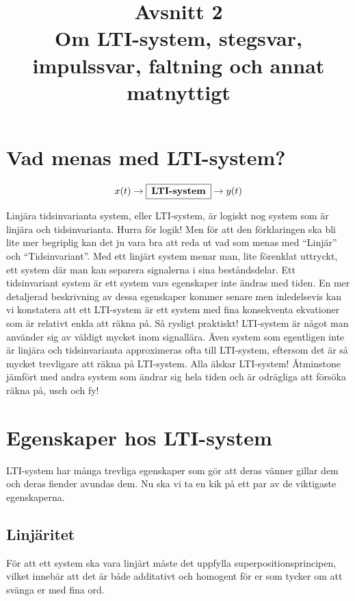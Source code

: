 \documentclass{article}
\title{Avsnitt 2 \\ 
\large Om LTI-system, stegsvar, impulssvar, faltning och annat matnyttigt}
\author{ }
\date{}
\begin{document}
\maketitle

\section{Vad menas med LTI-system?}
$$x(t) \rightarrow \framebox[1.2\width]{\textbf{LTI-system}} \rightarrow y(t) $$

Linjära tidsinvarianta system, eller LTI-system, är logiskt nog system som är
linjära och tidsinvarianta. Hurra för logik! Men för att den förklaringen ska
bli lite mer begriplig kan det ju vara bra att reda ut vad som menas med
“Linjär” och “Tidsinvariant”. Med ett linjärt system menar man, lite
förenklat uttryckt, ett system där man kan separera signalerna i sina
beståndsdelar. Ett tidsinvariant system är ett system vars egenskaper inte
ändras med tiden. En mer detaljerad beskrivning av dessa egenskaper kommer
senare men inledelsevis kan vi konstatera att ett LTI-system är ett system
med fina konsekventa ekvationer som är relativt enkla att räkna på. Så
rysligt praktiskt!
\newline
LTI-system är något man använder sig av väldigt mycket inom signallära. Även
system som egentligen inte är linjära och tidsinvarianta approximeras ofta
till LTI-system, eftersom det är så mycket trevligare att räkna på
LTI-system. Alla älskar LTI-system! Åtminstone jämfört med andra system som
ändrar sig hela tiden och är odrägliga att försöka räkna på, usch och fy!

\section{Egenskaper hos LTI-system}

LTI-system har många trevliga egenskaper som gör att deras vänner gillar
dem och deras fiender avundas dem. Nu ska vi ta en kik på ett par av de viktigaste egenskaperna.


\subsection{Linjäritet}
För att ett system ska vara linjärt måste det uppfylla
superpositionsprincipen, vilket innebär att det är både  additativt och
homogent för er som tycker om att svänga er med fina ord. 
\end{document}
